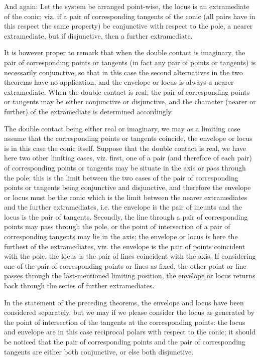 \documentclass[11pt,a4paper]{book}
\begin{document}
And again: Let the system be arranged point-wise, the locus is an extramediate of the conic; viz. if a pair of corresponding tangents of the conic (all pairs have in this respect the same property) be conjunctive with respect to the pole, a nearer extramediate, but if disjunctive, then a further extramediate.

It is however proper to remark that when the double contact is imaginary, the pair of corresponding points or tangents (in fact any pair of points or tangents) is necessarily conjunctive, so that in this case the second alternatives in the two theorems have no application, and the envelope or locus is always a nearer extramediate. When the double contact is real, the pair of corresponding points or tangents may be either conjunctive or disjunctive, and the character (nearer or further) of the extramediate is determined accordingly.

The double contact being either real or imaginary, we may as a limiting case assume that the corresponding points or tangents coincide, the envelope or locus is in this case the conic itself. Suppose that the double contact is real, we have here two other limiting cases, viz. first, one of a pair (and therefore of each pair) of corresponding points or tangents may be situate in the axis or pass through the pole; this is the limit between the two cases of the pair of corresponding points or tangents being conjunctive and disjunctive, and therefore the envelope or locus must be the conic which is the limit between the nearer extramediates and the further extramediates, i.e. the envelope is the pair of ineunts and the locus is the pair of tangents. Secondly, the line through a pair of corresponding points may pass through the pole, or the point of intersection of a pair of corresponding tangents may lie in the axis; the envelope or locus is here the furthest of the extramediates, viz. the envelope is the pair of points coincident with the pole, the locus is the pair of lines coincident with the axis. If considering one of the pair of corresponding points or lines as fixed, the other point or line passes through the last-mentioned limiting position, the envelope or locus returns back through the series of further extramediates.

In the statement of the preceding theorems, the envelope and locus have been considered separately, but we may if we please consider the locus as generated by the point of intersection of the tangents at the corresponding points: the locus and envelope are in this case reciprocal polars with respect to the conic; it should be noticed that the pair of corresponding points and the pair of corresponding tangents are either both conjunctive, or else both disjunctive.
\end{document}

